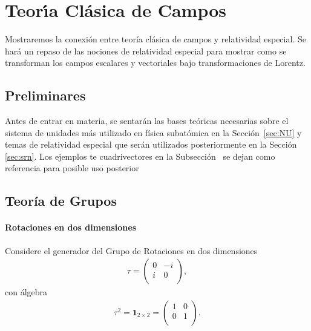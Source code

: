 \chapter{Teor\'\i a Cl\'asica de Campos}
\label{chap:tcc} %
Mostraremos la conexión entre teoría clásica de campos y relatividad especial.
Se hará un repaso de las nociones de relatividad especial para mostrar como se transforman los campos escalares y vectoriales bajo transformaciones de Lorentz.

\section{Preliminares}
Antes de entrar en materia, se sentarán las bases teóricas necesarias sobre el sistema de unidades  más utilizado en física subatómica en la Sección~\ref{sec:NU} y temas de relatividad especial que serán utilizados posteriormente en la Sección \ref{sec:srn}. Los ejemplos te cuadrivectores en la Subsección~ se dejan como referencia para posible uso posterior

\section{Teoría de Grupos}

\subsubsection{Rotaciones en dos dimensiones}
Considere el generador del Grupo de Rotaciones en dos dimensiones
\begin{align}
  \tau=
  \begin{pmatrix}
   0 & -i \\
   i & 0 \\    
  \end{pmatrix},
\end{align}
con álgebra
\begin{align}
  \tau^2=\boldsymbol{1}_{2\times2}=
  \begin{pmatrix}
    1 & 0\\
    0 & 1\\
  \end{pmatrix}.
\end{align}

